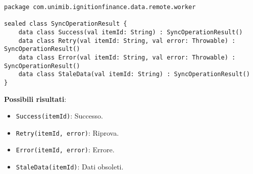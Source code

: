 \begin{lstlisting}[caption=SyncOperationResult.kt, label=lst:syncoperationresult, basicstyle=\ttfamily\scriptsize, breaklines=true, breakatwhitespace=true, tabsize=4, backgroundcolor=\color{codegray}]
package com.unimib.ignitionfinance.data.remote.worker

sealed class SyncOperationResult {
    data class Success(val itemId: String) : SyncOperationResult()
    data class Retry(val itemId: String, val error: Throwable) : SyncOperationResult()
    data class Error(val itemId: String, val error: Throwable) : SyncOperationResult()
    data class StaleData(val itemId: String) : SyncOperationResult()
}
\end{lstlisting}

\textbf{Possibili risultati}:
\begin{itemize}
    \item \texttt{Success(itemId)}: Successo.
    \item \texttt{Retry(itemId, error)}: Riprova.
    \item \texttt{Error(itemId, error)}: Errore.
    \item \texttt{StaleData(itemId)}: Dati obsoleti.
\end{itemize}